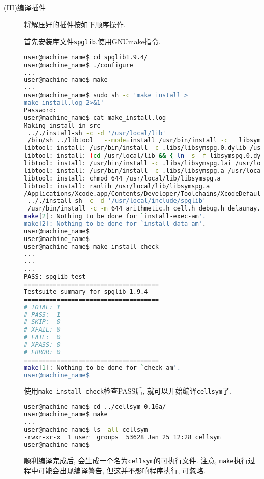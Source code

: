\documentclass[a4paper, 10pt]{article}
\begin{document}
\begin{description}
        \item[(III)编译插件]将解压好的插件按如下顺序操作.

        首先安装库文件\verb|spglib|.使用GNUmake指令. 
        \begin{lstlisting}[language={bash}]
user@machine_name$ cd spglib1.9.4/
user@machine_name$ ./configure
...
user@machine_name$ make
...
user@machine_name$ sudo sh -c 'make install > 
make_install.log 2>&1'
Password:
user@machine_name$ cat make_install.log 
Making install in src
 .././install-sh -c -d '/usr/local/lib'
 /bin/sh ../libtool   --mode=install /usr/bin/install -c   libsymspg.la '/usr/local/lib'
libtool: install: /usr/bin/install -c .libs/libsymspg.0.dylib /usr/local/lib/libsymspg.0.dylib
libtool: install: (cd /usr/local/lib && { ln -s -f libsymspg.0.dylib libsymspg.dylib || { rm -f libsymspg.dylib && ln -s libsymspg.0.dylib libsymspg.dylib; }; })
libtool: install: /usr/bin/install -c .libs/libsymspg.lai /usr/local/lib/libsymspg.la
libtool: install: /usr/bin/install -c .libs/libsymspg.a /usr/local/lib/libsymspg.a
libtool: install: chmod 644 /usr/local/lib/libsymspg.a
libtool: install: ranlib /usr/local/lib/libsymspg.a
/Applications/Xcode.app/Contents/Developer/Toolchains/XcodeDefault.xctoolchain/usr/bin/ranlib: file: /usr/local/lib/libsymspg.a(debug.o) has no symbols
 .././install-sh -c -d '/usr/local/include/spglib'
 /usr/bin/install -c -m 644 arithmetic.h cell.h debug.h delaunay.h hall_symbol.h kgrid.h kpoint.h mathfunc.h niggli.h pointgroup.h primitive.h refinement.h site_symmetry.h sitesym_database.h spacegroup.h spg_database.h spglib.h spin.h symmetry.h version.h '/usr/local/include/spglib'
make[2]: Nothing to be done for `install-exec-am'.
make[2]: Nothing to be done for `install-data-am'.
user@machine_name$
user@machine_name$
user@machine_name$ make install check
...
...
...
PASS: spglib_test
=====================================
Testsuite summary for spglib 1.9.4
=====================================
# TOTAL: 1
# PASS:  1
# SKIP:  0
# XFAIL: 0
# FAIL:  0
# XPASS: 0
# ERROR: 0
=====================================
make[1]: Nothing to be done for `check-am'.
user@machine_name$
        \end{lstlisting}
        使用\verb|make install check|检查PASS后, 就可以开始编译\verb|cellsym|了.
        \begin{lstlisting}[language={bash}]
user@machine_name$ cd ../cellsym-0.16a/
user@machine_name$ make
...
user@machine_name$ ls -all cellsym
-rwxr-xr-x  1 user  groups  53628 Jan 25 12:28 cellsym
user@machine_name$ 
        \end{lstlisting}
        顺利编译完成后, 会生成一个名为\verb|cellsym|的可执行文件.
        注意, \verb|make|执行过程中可能会出现编译警告, 但这并不影响程序执行, 可忽略.


\end{description}
\end{document}
